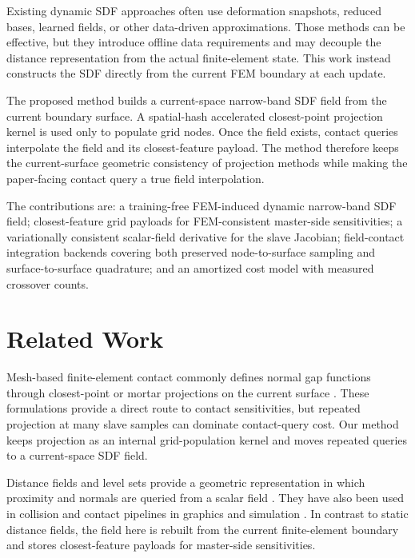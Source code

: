 \documentclass[11pt]{article}
\begin{document}
Existing dynamic SDF approaches often use deformation snapshots, reduced bases, learned fields, or other data-driven approximations. Those methods can be effective, but they introduce offline data requirements and may decouple the distance representation from the actual finite-element state. This work instead constructs the SDF directly from the current FEM boundary at each update.

The proposed method builds a current-space narrow-band SDF field from the current boundary surface. A spatial-hash accelerated closest-point projection kernel is used only to populate grid nodes. Once the field exists, contact queries interpolate the field and its closest-feature payload. The method therefore keeps the current-surface geometric consistency of projection methods while making the paper-facing contact query a true field interpolation.

The contributions are: a training-free FEM-induced dynamic narrow-band SDF field; closest-feature grid payloads for FEM-consistent master-side sensitivities; a variationally consistent scalar-field derivative for the slave Jacobian; field-contact integration backends covering both preserved node-to-surface sampling and surface-to-surface quadrature; and an amortized cost model with measured crossover counts.

\section{Related Work}

Mesh-based finite-element contact commonly defines normal gap functions through closest-point or mortar projections on the current surface \cite{wriggers2006computational,laursen2002computational}. These formulations provide a direct route to contact sensitivities, but repeated projection at many slave samples can dominate contact-query cost. Our method keeps projection as an internal grid-population kernel and moves repeated queries to a current-space SDF field.

Distance fields and level sets provide a geometric representation in which proximity and normals are queried from a scalar field \cite{osher2003level,frisken2000adaptively,jones2006distance}. They have also been used in collision and contact pipelines in graphics and simulation \cite{bridson2002robust}. In contrast to static distance fields, the field here is rebuilt from the current finite-element boundary and stores closest-feature payloads for master-side sensitivities.
\end{document}
